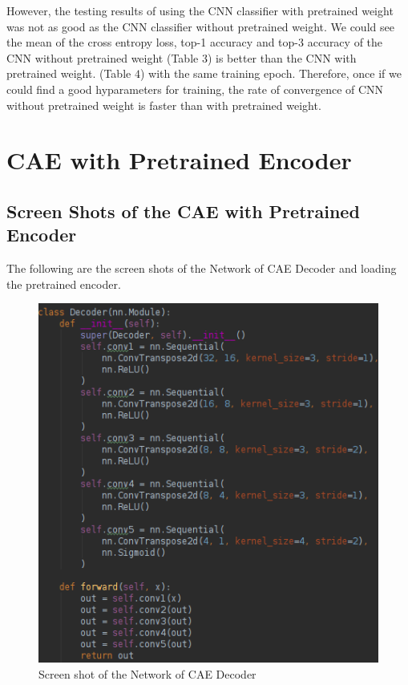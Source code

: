 \documentclass{article}
\begin{document}
However, the testing results of using the CNN classifier with pretrained weight was not as good as the CNN classifier without pretrained weight. We could see the mean of the cross entropy loss, top-1 accuracy and top-3 accuracy of the CNN without pretrained weight (Table $3$) is better than the CNN with pretrained weight. (Table $4$) with the same training epoch. Therefore, once if we could find a good hyparameters for training, the rate of convergence of CNN without pretrained weight is faster than with pretrained weight.



\pagebreak

\section{CAE with Pretrained Encoder}

\subsection{Screen Shots of the CAE with Pretrained Encoder}
The following are the screen shots of the Network of CAE Decoder and loading the pretrained encoder.

\begin{figure}[h]
  \centering
  \includegraphics[scale=1]{decoder.png}
  \caption{Screen shot of the Network of CAE Decoder}
\end{figure}
\end{document}
